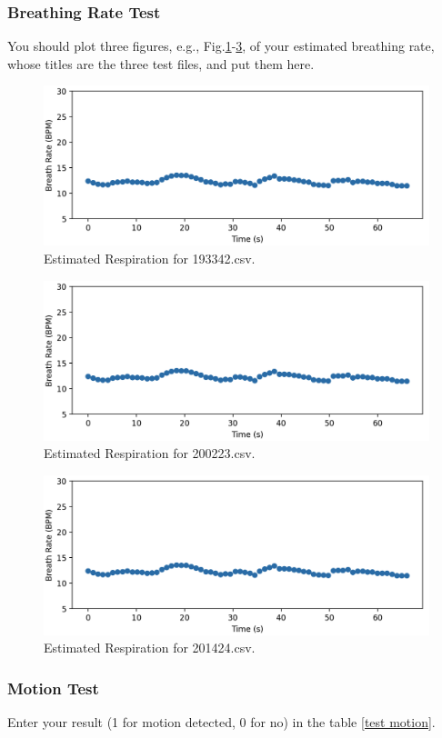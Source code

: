 \subsubsection{Breathing Rate Test}
You should plot three figures, e.g., Fig.\ref{res1}-\ref{res3}, of your estimated breathing rate, whose titles are the three test files, and put them here. 
\begin{figure}[!h]
    \centering
    \includegraphics[width=0.5\linewidth]{fig/Exp.jpg}
    \caption{Estimated Respiration for \rm{193342.csv}.}
    \label{res1}
\end{figure}

\begin{figure}[!h]
    \centering
    \includegraphics[width=0.5\linewidth]{fig/Exp.jpg}
    \caption{Estimated Respiration for \rm{200223.csv}.}
    \label{res2}
\end{figure}

\begin{figure}[!h]
    \centering
    \includegraphics[width=0.5\linewidth]{fig/Exp.jpg}
    \caption{Estimated Respiration for \rm{201424.csv}.}
    \label{res3}
\end{figure}

\subsubsection{Motion Test}
Enter your result (1 for motion detected, 0 for no) in the table \ref{test motion}.

